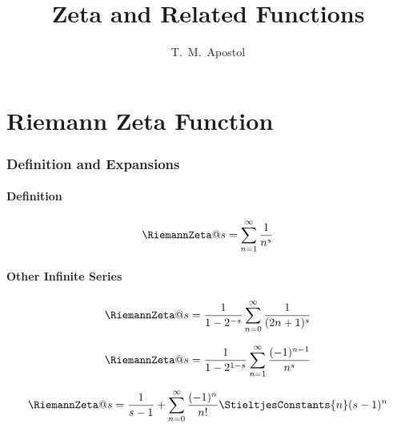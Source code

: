 \documentclass{article}
\begin{document}
\title{Zeta and Related Functions}
\author{T.~M.~Apostol}

\maketitle

\part{Riemann Zeta Function}\label{pt:ZE.MATH}

\section{Definition and Expansions}\label{sec:ZE.Def}
 

\subsection{Definition}\label{sec:ZE.Def.Def}


\begin{equation}\label{eq:ZE.EX.ZE1}%
  \RiemannZeta@{s} = \sum_{n=1}^\infty \frac{1}{n^s}
\end{equation}

\subsection{Other Infinite Series}\label{sec:ZE.Def.OIS}


\begin{equation}\label{eq:ZE.EX.ZE2}%
  \RiemannZeta@{s} = \frac{1}{1 - 2^{-s}} \sum_{n=0}^\infty \frac{1}{(2n+1)^s}
\end{equation}

\begin{equation}\label{eq:ZE.EX.ZE3}%
  \RiemannZeta@{s}
  = \frac{1}{1 - 2^{1-s}} \sum_{n=1}^\infty \frac{\opminus^{n-1}}{n^s}
\end{equation}

\begin{equation}\label{eq:ZE.EX.ZE4}%
  \RiemannZeta@{s}
  = \frac{1}{s-1} + \sum_{n=0}^\infty \frac{\opminus^n}{n!} \StieltjesConstants{n} (s-1)^n
\end{equation}
\end{document}
